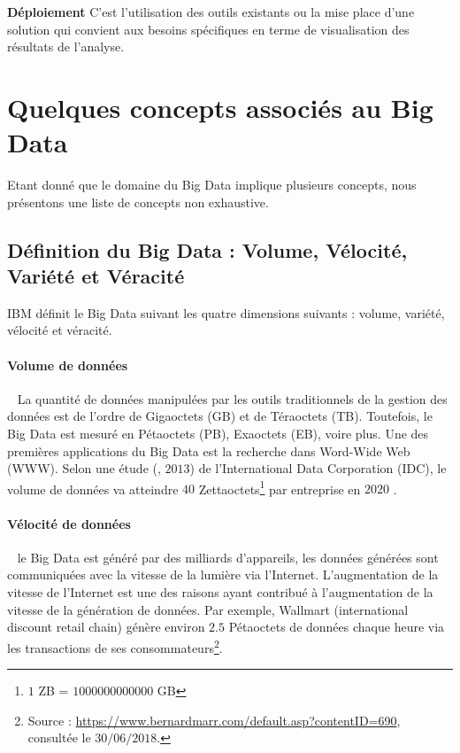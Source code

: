 \textbf{Déploiement}  C'est l'utilisation  des outils existants ou  la mise place d'une solution qui convient aux  besoins spécifiques en terme de visualisation des résultats de l'analyse. \par




	\section{Quelques concepts associés au Big Data}

Etant donné que le domaine du Big Data implique plusieurs concepts, nous présentons une liste de concepts  non exhaustive. 

		\subsection{Définition du Big Data : Volume, Vélocité, Variété et Véracité}
		
		IBM définit le Big Data suivant les quatre dimensions suivants : volume, variété, vélocité et véracité. 
		\paragraph{Volume de données}~
		La quantité de données manipulées par les outils traditionnels de la gestion des données est de l'ordre de Gigaoctets (GB) et de Téraoctets (TB). Toutefois, le Big Data est mesuré en Pétaoctets (PB), Exaoctets (EB), voire plus. Une des premières applications du Big Data est la recherche dans Word-Wide Web (WWW). Selon une étude (\cite{6567202}, $2013$) de l'International Data Corporation (IDC), le volume de données  va atteindre $40$ Zettaoctets\footnote{ $ 1$ ZB = $1000000000000$ GB } par  entreprise en $2020$ .
		
		\paragraph{Vélocité de données} ~
		le Big Data est généré par des milliards
		d'appareils, les données générées sont communiquées avec la vitesse de la lumière via l'Internet. L'augmentation de la vitesse de l'Internet est une  des raisons ayant contribué à l'augmentation de la vitesse de la génération de données.	
		Par exemple, Wallmart (international discount retail chain) génère environ   $2.5$ Pétaoctets de données chaque  heure via les transactions de ses consommateurs\footnote{Source : \url{https://www.bernardmarr.com/default.asp?contentID=690}, consultée le $ 30/06/2018 $.}.
		
